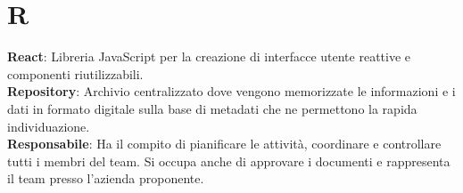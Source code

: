 \section{R}
\textbf{React}: Libreria JavaScript per la creazione di interfacce utente reattive e componenti riutilizzabili.\\
\textbf{Repository}: Archivio centralizzato dove vengono memorizzate le informazioni e i dati in formato digitale sulla base di metadati che ne permettono la rapida individuazione.\\
\textbf{Responsabile}: Ha il compito di pianificare le attività, coordinare e controllare tutti i membri del team. Si occupa anche di approvare i documenti e rappresenta il team presso l'azienda proponente.\\
